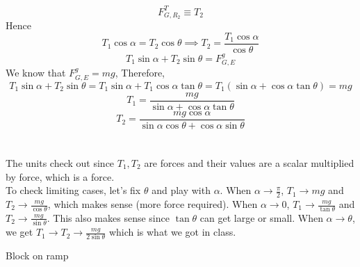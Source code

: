 \documentclass[11pt]{scrartcl}
\begin{document}
\begin{soln}
$$F_{G,R_2}^T\equiv T_2$$
Hence
$$T_1\cos\alpha=T_2\cos\theta\implies T_2=\frac{T_1\cos\alpha}{\cos\theta}$$
$$T_1\sin\alpha+T_2\sin\theta=F_{G,E}^g$$
We know that $F_{G,E}^g=mg$, Therefore,
$$T_1\sin\alpha+T_2\sin\theta=T_1\sin\alpha+T_1\cos\alpha\tan\theta=T_1(\sin\alpha+\cos\alpha\tan\theta)=mg$$
$$\boxed{T_1=\frac{mg}{\sin\alpha+\cos\alpha\tan\theta}}$$
$$\boxed{T_2=\frac{mg\cos\alpha}{\sin\alpha\cos\theta+\cos\alpha\sin\theta}}$$
\\ \\
The units check out since $T_1,T_2$ are forces and their values are a scalar multiplied by force, which is a force.
\\
To check limiting cases, let's fix $\theta$ and play with $\alpha$. When $\alpha\to \frac{\pi}{2}$, $T_1\to mg$ and $T_2\to \frac{mg}{\cos\theta}$, which makes sense (more force required).
When $\alpha\to 0$, $T_1\to \frac{mg}{\tan\theta}$ and $T_2\to \frac{mg}{\sin\theta}$. This also makes sense since $\tan\theta$ can get large or small.
When $\alpha\to\theta$, we get $T_1\to T_2\to \frac{mg}{2\sin\theta}$ which is what we got in class.
\end{soln}
\begin{example}
  Block on ramp
\end{example}
\end{document}
